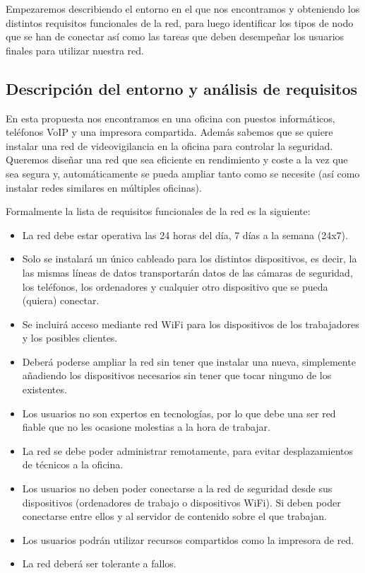 Empezaremos describiendo el entorno en el que nos encontramos y obteniendo los distintos requisitos funcionales de la red, para luego identificar los tipos de nodo que se han de conectar así como las tareas que deben desempeñar los usuarios finales para utilizar nuestra red.

\subsection{Descripción del entorno y análisis de requisitos}

En esta propuesta nos encontramos en una oficina con puestos informáticos, teléfonos VoIP y una impresora compartida. Además sabemos que se quiere instalar una red de videovigilancia en la oficina para controlar la seguridad. Queremos diseñar una red que sea eficiente en rendimiento y coste a la vez que sea segura y, automáticamente se pueda ampliar tanto como se necesite (así como instalar redes similares en múltiples oficinas).

Formalmente la lista de requisitos funcionales de la red es la siguiente:

\begin{itemize}
    \item La red debe estar operativa las 24 horas del día, 7 días a la semana (24x7).
    \item Solo se instalará un único cableado para los distintos dispositivos, es decir, la las mismas líneas de datos transportarán datos de las cámaras de seguridad, los teléfonos, los ordenadores y cualquier otro dispositivo que se pueda (quiera) conectar.
    \item Se incluirá acceso mediante red WiFi para los dispositivos de los trabajadores y los posibles clientes.
    \item Deberá poderse ampliar la red sin tener que instalar una nueva, simplemente añadiendo los dispositivos necesarios sin tener que tocar ninguno de los existentes.
    \item Los usuarios no son expertos en tecnologías, por lo que debe una ser red fiable que no les ocasione molestias a la hora de trabajar.
    \item La red se debe poder administrar remotamente, para evitar desplazamientos de técnicos a la oficina.
    \item Los usuarios no deben poder conectarse a la red de seguridad desde sus dispositivos (ordenadores de trabajo o dispositivos WiFi). Si deben poder conectarse entre ellos y al servidor de contenido sobre el que trabajan.
    \item Los usuarios podrán utilizar recursos compartidos como la impresora de red.
    \item La red deberá ser tolerante a fallos.
\end{itemize}

